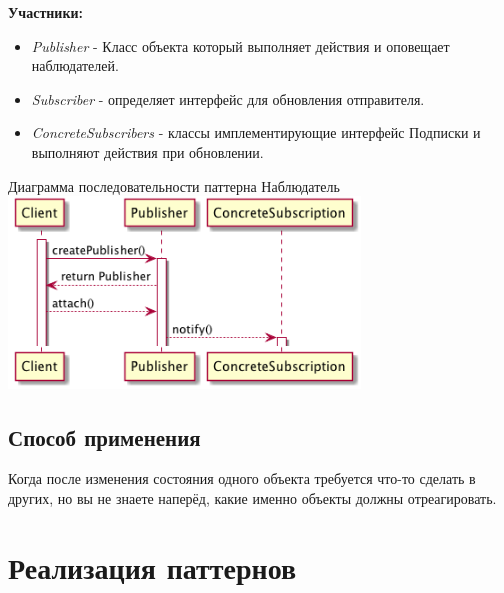 \documentclass[PI,LAB]{HSEUniversity}
\begin{document}
\textbf{Участники:}
\begin{itemize}
    \item \emph{Publisher} - Класс объекта который выполняет действия и оповещает наблюдателей.
    \item \emph{Subscriber} - определяет интерфейс для обновления отправителя.
    \item \emph{ConcreteSubscribers} - классы имплементирующие интерфейс Подписки и выполняют действия при обновлении.

\end{itemize}

\begin{FIGURE}[h]{Диаграмма последовательности паттерна Наблюдатель\label{fig:example-figure}}
    \includegraphics[width=0.7\textwidth]{../out/diagrams/observer/observer}
\end{FIGURE}

\section{Способ применения}
Когда после изменения состояния одного объекта требуется что-то сделать в других, но вы не знаете наперёд, какие именно объекты должны отреагировать.
\chapter{Реализация паттернов}
\end{document}
